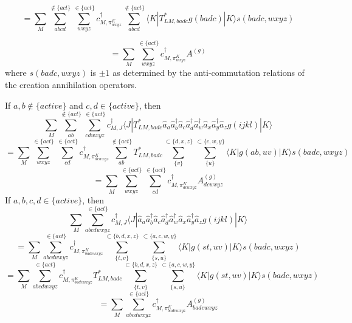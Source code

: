 \documentclass[12pt]{article}
\begin{document}
\begin{equation*}
= \sum_{M}  \sum_{abcd}^{\notin \{act\} } \sum_{wxyz}^{\in\{act\}} 
c^{\dagger}_{M,\pi^{K}_{wxyz}}
 \sum_{abcd}^{\notin \{act\} }  \langle K |T^{*}_{LM,badc}g(badc) |K  \rangle s(badc, wxyz)
\end{equation*}
 
\begin{equation*}
= \sum_{M}  \sum_{wxyz}^{\in\{act\}} c^{\dagger}_{M,\pi^{K}_{wxyz}}  A^{(g)}
\end{equation*}
where $s(badc,wxyz)$ is $\pm 1$ as determined by the anti-commutation relations of the creation annihilation operators.

\noindent If $a,b \notin \{active\} $ and $c,d \in \{active\}$, then
\begin{equation*}
 \sum_{M}  \sum_{ab}^{\notin \{act\} } \sum_{cdwxyz}^{\in\{act\}} 
 c^{\dagger}_{M,J}  \langle J|T^{*}_{LM,badc}\hat{a}_{a}\hat{a}^{\dagger}_{b}
\hat{a}_{c}\hat{a}^{\dagger}_{d}\hat{a}^{\dagger}_{w}\hat{a}_{x}\hat{a}^{\dagger}_{y}\hat{a}_{z}g(ijkl) |K  \rangle
\end{equation*}
\begin{equation*}
= \sum_{M}  \sum_{wxyz}^{\in\{act\}} 
\sum_{cd}^{\in\{act\}}  c^{\dagger}_{M,\pi^{K}_{dcwxyz}}
\sum_{ab}^{\notin \{act\} }
T^{*}_{LM,badc}
\sum_{\{v\}}^{\subset\{d,x,z\}}\sum_{\{u\}}^{\subset\{c,w,y\}}
\langle K| g(ab,uv) |K  \rangle s(badc,wxyz)
\end{equation*}
\begin{equation*}
= \sum_{M}  \sum_{wxyz}^{\in\{act\}} 
\sum_{cd}^{\in\{act\}}  c^{\dagger}_{M,\pi^{K}_{dcwxyz}}A^{(g)}_{dcwxyz}
\end{equation*}
\noindent If $a,b,c,d \in \{active\}$, then
\begin{equation*}
 \sum_{M}  \sum_{abcdwxyz}^{\in\{act\}} 
 c^{\dagger}_{M,J}  \langle J|\hat{a}_{a}\hat{a}^{\dagger}_{b}
\hat{a}_{c}\hat{a}^{\dagger}_{d}\hat{a}^{\dagger}_{w}\hat{a}_{x}\hat{a}^{\dagger}_{y}\hat{a}_{z}g(ijkl) |K  \rangle
\end{equation*}
\begin{equation*}
= \sum_{M}   \sum_{abcdwxyz}^{\in\{act\}} 
 c^{\dagger}_{M,\pi^{K}_{badcwxyz}} 
 \sum_{\{t,v\}}^{\subset\{b,d,x,z\}}\sum_{\{s,u\}}^{\subset\{a,c,w,y\}}
 \langle K|g(st,uv) |K  \rangle  s(badc,wxyz)
\end{equation*}
\begin{equation*}
= \sum_{M}   \sum_{abcdwxyz}^{\in\{act\}} 
 c^{\dagger}_{M,\pi^{K}_{badcwxyz}} T^{*}_{LM,badc}
 \sum_{\{t,v\}}^{\subset\{b,d,x,z\}}\sum_{\{s,u\}}^{\subset\{a,c,w,y\}}
 \langle K|g(st,uv) |K  \rangle  s(badc,wxyz)
\end{equation*}
\begin{equation*}
= \sum_{M}   \sum_{abcdwxyz}^{\in\{act\}} 
 c^{\dagger}_{M,\pi^{K}_{badcwxyz}} A_{badcwxyz}^{(g)}\end{equation*}
\end{document}
